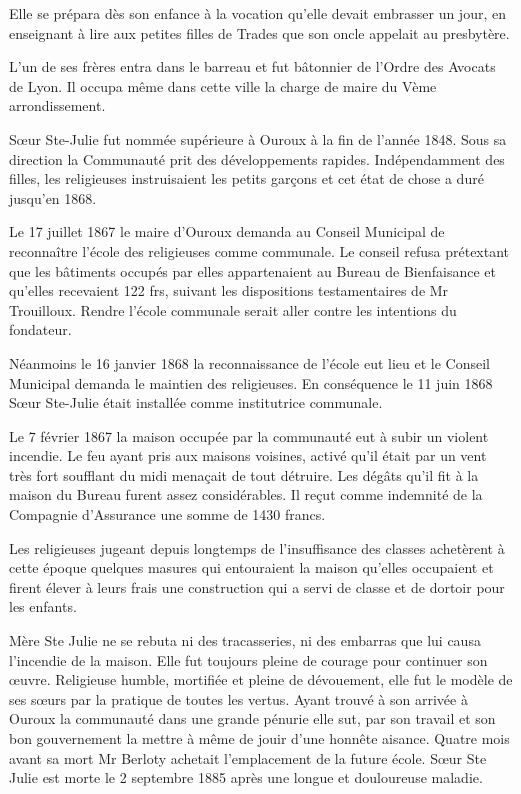 Elle se prépara dès son enfance à la vocation qu'elle devait embrasser un jour, en enseignant à lire aux petites filles de Trades que son oncle appelait au presbytère.

L'un de ses frères entra dans le barreau et fut bâtonnier de l'Ordre des Avocats de Lyon. Il occupa même dans cette ville la charge de maire du Vème arrondissement.

Sœur Ste-Julie fut nommée supérieure à Ouroux à la fin de l'année 1848. Sous sa direction la Communauté prit des développements rapides. Indépendamment des filles, les religieuses instruisaient les petits garçons et cet état de chose a duré jusqu'en 1868.

Le 17 juillet 1867 le maire d'Ouroux demanda au Conseil Municipal de reconnaître l'école des religieuses comme communale. Le conseil refusa prétextant que les bâtiments occupés par elles appartenaient au Bureau de Bienfaisance et qu'elles recevaient 122 frs, suivant les dispositions testamentaires de Mr Trouilloux. Rendre l'école communale serait aller contre les intentions du fondateur.

Néanmoins le 16 janvier 1868 la reconnaissance de l'école eut lieu et le Conseil Municipal demanda le maintien des religieuses. En conséquence le 11 juin 1868 Sœur Ste-Julie était installée comme institutrice communale.

Le 7 février 1867 la maison occupée par la communauté eut à subir un violent incendie. Le feu ayant pris aux maisons voisines, activé qu'il était par un vent très fort soufflant du midi menaçait de tout détruire. Les dégâts qu'il fit à la maison du Bureau furent assez considérables. Il reçut comme indemnité de la Compagnie d'Assurance une somme de 1430 francs.

Les religieuses jugeant depuis longtemps de l'insuffisance des classes achetèrent à cette époque quelques masures qui entouraient la maison qu'elles occupaient et firent élever à leurs frais une construction qui a servi de classe et de dortoir pour les enfants.

Mère Ste Julie ne se rebuta ni des tracasseries, ni des embarras que lui causa l'incendie de la maison. Elle fut toujours pleine de courage pour continuer son œuvre. Religieuse humble, mortifiée et pleine de dévouement, elle fut le modèle de ses sœurs par la pratique de toutes les vertus. Ayant trouvé à son arrivée à Ouroux la communauté dans une grande pénurie elle sut, par son travail et son bon gouvernement la mettre à même de jouir d'une honnête aisance. Quatre mois avant sa mort Mr Berloty achetait l'emplacement de la future école. Sœur Ste Julie est morte le 2 septembre 1885 après une longue et douloureuse maladie.

